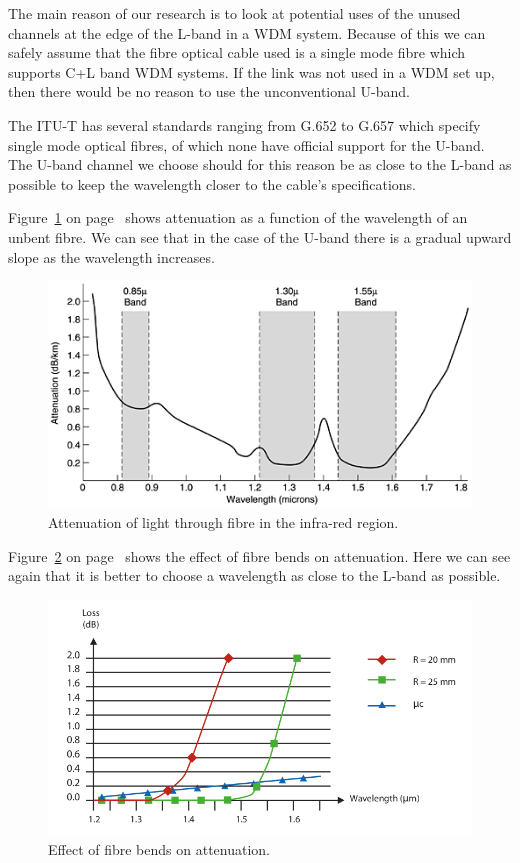 \documentclass{article}
\begin{document}
The main reason of our research is to look at potential uses of the unused channels at the edge of the L-band in a WDM system.
Because of this we can safely assume that the fibre optical cable used is a single mode fibre which supports C+L band WDM systems.
If the link was not used in a WDM set up, then there would be no reason to use the unconventional U-band.

The ITU-T has several standards ranging from G.652 to G.657 which specify single mode optical fibres\cite[chap. 6-7]{itu-t:manual2009}, of which none have official support for the U-band.
The U-band channel we choose should for this reason be as close to the L-band as possible to keep the wavelength closer to the cable's specifications.

Figure~\ref{fig:attenuation} on page~\pageref{fig:attenuation} shows attenuation as a function of the wavelength of an unbent fibre. We can see that in the case of the U-band there is a gradual upward slope as the wavelength increases.
\begin{figure}[h]
\centerline{\includegraphics[scale=0.5, trim = 0mm 0mm 0mm 0mm]{images/attenuation.png}}
\caption{Attenuation of light through fibre in the infra-red region.\cite[fig 2-6]{tannenbaum:networks}}
\label{fig:attenuation}
\end{figure}

Figure~\ref{fig:attenuation-bends} on page~\pageref{fig:attenuation-bends} shows the effect of fibre bends on attenuation. Here we can see again that it is better to choose a wavelength as close to the L-band as possible.
\begin{figure}[h]
\centerline{\includegraphics[scale=0.3, trim = 0mm 0mm 0mm 0mm]{images/attenuation-bends.png}}
\caption{Effect of fibre bends on attenuation.\cite[p. 27]{refguide:2011}}
\label{fig:attenuation-bends}
\end{figure}
\end{document}
